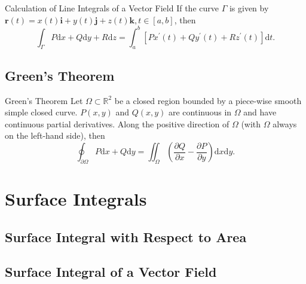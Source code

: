 \begin{proposition}{Calculation of Line Integrals of a Vector Field}{}
  If the curve $\Gamma$ is given by $\mathbf{r}(t) = x(t)\mathbf{i} +
  y(t)\mathbf{j} + z(t)\mathbf{k}, t \in [a, b]$,
  then
  \begin{equation}
    \int_{\Gamma}P \mathrm{d} x + Q\mathrm{d} y + R\mathrm{d} z
    = \int_a^b \left[ Px^{\prime}(t) + Qy^{\prime}(t) + Rz^{\prime}(t) \right]\mathrm{d} t.
  \end{equation}
\end{proposition}

\subsection{Green's Theorem}

\begin{theorem}{Green's Theorem}{}
  Let $\Omega \subset \mathbb{R}^2$ be a closed region bounded by a piece-wise
  smooth simple closed curve.
  $P(x,y)$ and $Q(x,y)$ are continuous in $\Omega$ and have continuous partial derivatives.
  Along the positive direction of $\Omega$ (with $\Omega$ always on the
  left-hand side), then
  \begin{equation}
    \oint_{\partial \Omega} P \mathrm{d} x + Q \mathrm{d} y
    = \iint_{\Omega} \left( \frac{\partial Q}{\partial x} - \frac{\partial P}{\partial y} \right) \mathrm{d} x \mathrm{d}y.
  \end{equation}
\end{theorem}






\section{Surface Integrals}

\subsection{Surface Integral with Respect to Area}

\subsection{Surface Integral of a Vector Field}



